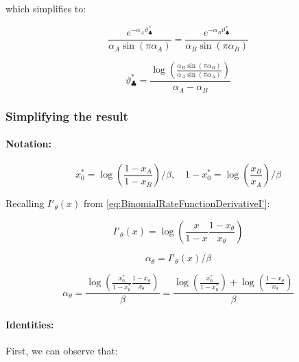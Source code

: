 \documentclass{article}
\theoremstyle{definition}
\begin{document}
which simplifies to:

\begin{equation}
    \frac{e^{-\alpha_A \vartheta^*_\clubsuit}}{\alpha_A \sin(\pi \alpha_A)} = 
    \frac{e^{-\alpha_B \vartheta^*_\clubsuit}}{\alpha_B \sin(\pi \alpha_B)} 
\end{equation}

\begin{equation}
    \vartheta^*_\clubsuit = \frac{\log \left (  \frac{\alpha_B \sin(\pi \alpha_B)}{\alpha_A \sin(\pi \alpha_A)}  \right ) }{\alpha_A - \alpha_B}
\end{equation}

\subsubsection{Simplifying the result}

\paragraph{Notation:}

\begin{equation}
    x_0^* = \log \left ( \frac{1-x_A}{1-x_B} \right )/\beta, \quad
    1-x_0^* = \log \left ( \frac{x_B}{x_A} \right )/\beta
\end{equation}

Recalling $I'_\theta(x)$ from \eqref{eq:BinomialRateFunctionDerivativeI'}:

\begin{equation}
    I'_\theta(x) = 
    \log \left ( \frac{x}{1-x} \frac{1-x_\theta}{x_\theta} \right )
\end{equation}

\begin{equation}
    \alpha_\theta = I'_\theta(x) / \beta
\end{equation}

\begin{equation}
    \alpha_\theta = \frac{\log \left ( \frac{x_0^*}{1-x_0^*} \frac{1-x_\theta}{x_\theta} \right )}{\beta} =
    \frac{\log \left ( \frac{x_0^*}{1-x_0^*} \right ) + \log \left ( \frac{1-x_\theta}{x_\theta} \right )}{\beta}
\end{equation}

\paragraph{Identities:}

First, we can observe that:
\end{document}
